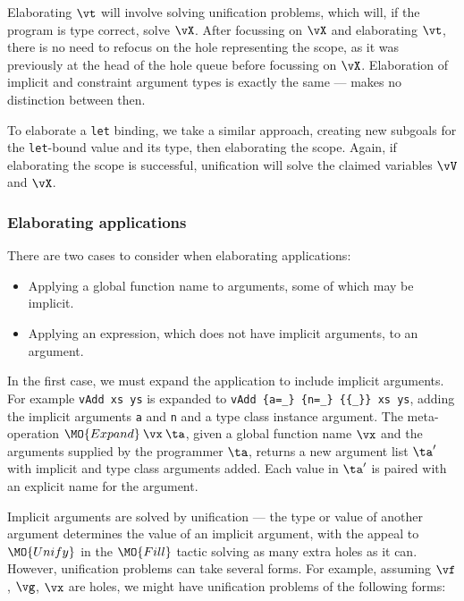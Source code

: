 Elaborating $\vt$ will involve solving unification problems, which will, if the
program is type correct, solve $\vX$. After focussing on $\vX$ and elaborating
$\vt$, there is no need to refocus on the hole representing the scope, as it was
previously at the head of the hole queue before focussing on $\vX$.
Elaboration of implicit and constraint
argument types is exactly the same --- \TT{} makes no distinction between then.

To elaborate a \texttt{let} binding, we take a similar approach, creating new subgoals
for the \texttt{let}-bound value and its type, then elaborating the scope. Again,
if elaborating the scope is successful, unification will solve the claimed variables
$\vV$ and $\vX$.

\subsubsection{Elaborating applications}

There are two cases to consider when elaborating applications:

\begin{itemize}
\item Applying a global function name to arguments, some of which may be implicit.
\item Applying an expression, which does not have implicit arguments, to an argument.
\end{itemize}

In the first case, we must expand the application to include implicit arguments.
For example \texttt{vAdd xs ys} is expanded to
\texttt{vAdd \{a=\_\} \{n=\_\} \{\{\_\}\} xs ys}, adding the implicit arguments
\texttt{a} and \texttt{n} and a type class instance argument. The meta-operation
$\MO{Expand}\:\vx\:\ta$, given a global function name $\vx$ and the
arguments supplied by the programmer $\ta$, returns a new argument list
$\ta'$ with implicit and type class arguments added. Each value in
$\ta'$ is paired with an explicit name for the argument.

Implicit arguments are solved by unification
--- the type or value of another argument determines the value of an implicit argument,
with the appeal to $\MO{Unify}$ in the $\MO{Fill}$ tactic solving as many extra holes
as it can. However, unification problems can take several forms. For example, assuming
$\vf$, $\vg$, $\vx$ are holes, we might have unification problems of the following
forms:

